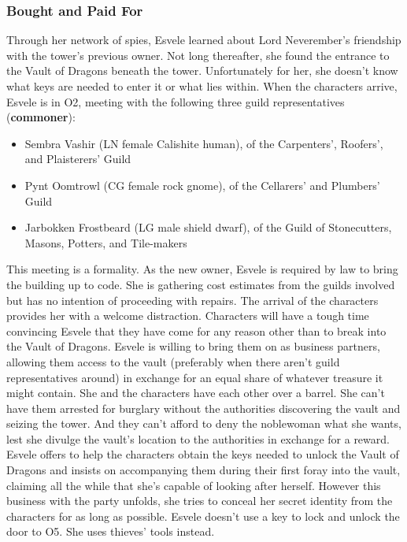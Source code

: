 \documentclass[10pt,a4paper,twoside,twocolumn,openany,nodeprecatedcode]{dndbook}
\begin{document}
\subsubsection{Bought and Paid For}
Through her network of spies, Esvele learned about Lord Neverember's friendship with the tower's previous owner. Not long thereafter, she found the entrance to the Vault of Dragons beneath the tower. Unfortunately for her, she doesn't know what keys are needed to enter it or what lies within. When the characters arrive, Esvele is in O2, meeting with the following three guild representatives (\textbf{commoner}):
\begin{itemize}

\item Sembra Vashir (LN female Calishite human), of the Carpenters', Roofers', and Plaisterers' Guild
\item Pynt Oomtrowl (CG female rock gnome), of the Cellarers' and Plumbers' Guild
\item Jarbokken Frostbeard (LG male shield dwarf), of the Guild of Stonecutters, Masons, Potters, and Tile-makers
\end{itemize}


This meeting is a formality. As the new owner, Esvele is required by law to bring the building up to code. She is gathering cost estimates from the guilds involved but has no intention of proceeding with repairs. The arrival of the characters provides her with a welcome distraction.
Characters will have a tough time convincing Esvele that they have come for any reason other than to break into the Vault of Dragons. Esvele is willing to bring them on as business partners, allowing them access to the vault (preferably when there aren't guild representatives around) in exchange for an equal share of whatever treasure it might contain. She and the characters have each other over a barrel. She can't have them arrested for burglary without the authorities discovering the vault and seizing the tower. And they can't afford to deny the noblewoman what she wants, lest she divulge the vault's location to the authorities in exchange for a reward.
Esvele offers to help the characters obtain the keys needed to unlock the Vault of Dragons and insists on accompanying them during their first foray into the vault, claiming all the while that she's capable of looking after herself. However this business with the party unfolds, she tries to conceal her secret identity from the characters for as long as possible.
Esvele doesn't use a key to lock and unlock the door to O5. She uses thieves' tools instead.
\end{document}
